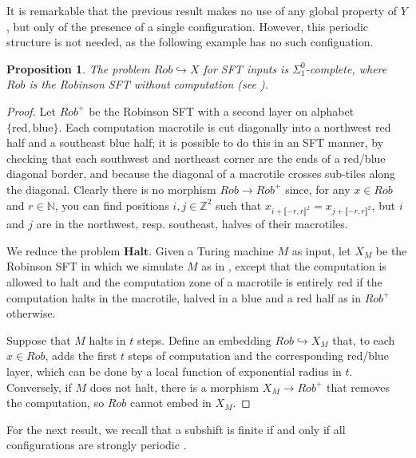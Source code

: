 \documentclass[a4paper]{article}
\newcommand{\Z}{\mathbb{Z}}
\newcommand{\N}{\mathbb{N}}
\newtheorem{proposition}[theorem]{Proposition}
\theoremstyle{definition}
\begin{document}
It is remarkable that the previous result makes no use of any global property of $Y$, but only of the presence of a single configuration. However, this periodic structure is not needed, as the following example has no such configuation.


\begin{proposition}
    The problem $Rob \hookrightarrow X$ for SFT inputs is $\Sigma^0_1$-complete, where $Rob$ is the Robinson SFT without computation (see \cite{robinson_undecidability_1971}).
\end{proposition}

\begin{proof}
    Let $Rob^+$ be the Robinson SFT with a second layer on alphabet $\{\textrm{red}, \textrm{blue}\}$. Each computation macrotile is cut diagonally into a northwest red half and a southeast blue half; it is possible to do this in an SFT manner, by checking that each southwest and northeast corner are the ends of a red/blue diagonal border, and because the diagonal of a macrotile crosses sub-tiles along the diagonal. Clearly there is no morphism $Rob \to Rob^+$ since, for any $x\in Rob$ and $r\in \N$, you can find positions $i,j\in \Z^2$ such that $x_{i+\llbracket -r,r \rrbracket^2} = x_{j+\llbracket -r,r \rrbracket^2}$, but $i$ and $j$ are in the northwest, resp. southeast, halves of their macrotiles.

    We reduce the problem $\textbf{Halt}$. Given a Turing machine $M$ as input, let $X_M$ be the Robinson SFT in which we simulate $M$ as in \cite{robinson_undecidability_1971}, except that the computation is allowed to halt and the computation zone of a macrotile is entirely red if the computation halts in the macrotile, halved in a blue and a red half as in $Rob^+$ otherwise.
    
    Suppose that $M$ halts in $t$ steps. Define an embedding $Rob \hookrightarrow X_M$ that, to each $x\in Rob$, adds the first $t$ steps of computation and the corresponding red/blue layer, which can be done by a local function of exponential radius in $t$. Conversely, if $M$ does not halt, there is a morphism $X_M \to Rob^{+}$ that removes the computation, so $Rob$ cannot embed in $X_M$.
\end{proof}

 For the next result, we recall that a subshift is finite if and only if all configurations are strongly periodic \cite[Theorem 3.8]{ballier2008structural}.
\end{document}
